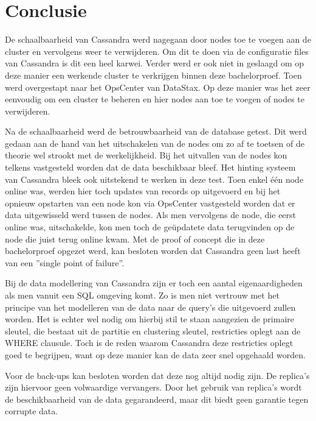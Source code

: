\chapter{Conclusie}
\label{ch:conclusie}


De schaalbaarheid van Cassandra werd nagegaan door nodes toe te voegen aan de cluster en vervolgens weer te verwijderen.
Om dit te doen via de configuratie files van Cassandra is dit een heel karwei.
Verder werd er ook niet in geslaagd om op deze manier een werkende cluster te verkrijgen binnen deze bachelorproef.
Toen werd overgestapt naar het OpsCenter van DataStax.
Op deze manier was het zeer eenvoudig om een cluster te beheren en hier nodes aan toe te voegen of nodes te verwijderen.

Na de schaalbaarheid werd de betrouwbaarheid van de database getest.
Dit werd gedaan aan de hand van het uitschakelen van de nodes om zo af te toetsen of de theorie wel strookt met de werkelijkheid.
Bij het uitvallen van de nodes kon telkens vastgesteld worden dat de data beschikbaar bleef.
Het hinting systeem van Cassandra bleek ook uitstekend te werken in deze test.
Toen enkel één node online was, werden hier toch updates van records op uitgevoerd en bij het opnieuw opstarten van een node kon via OpsCenter vastgesteld worden dat er data uitgewisseld werd tussen de nodes.
Als men vervolgens de node, die eerst online was, uitschakelde, kon men toch de geüpdatete data terugvinden op de node die juist terug online kwam.
Met de proof of concept die in deze bachelorproef opgezet werd, kan besloten worden dat Cassandra geen last heeft van een ''single point of failure''.

Bij de data modellering van Cassandra zijn er toch een aantal eigenaardigheden als men vanuit een SQL omgeving komt.
Zo is men niet vertrouw met het principe van het modelleren van de data naar de query's die uitgevoerd zullen worden.
Het is echter wel nodig om hierbij stil te staan aangezien de primaire sleutel, die bestaat uit de partitie en clustering sleutel, restricties oplegt aan de WHERE clausule.
Toch is de reden waarom Cassandra deze restricties oplegt goed te begrijpen, want op deze manier kan de data zeer snel opgehaald worden.

Voor de back-ups kan besloten worden dat deze nog altijd nodig zijn.
De replica's zijn hiervoor geen volwaardige vervangers.
Door het gebruik van replica's wordt de beschikbaarheid van de data gegarandeerd, maar dit biedt geen garantie tegen corrupte data.

